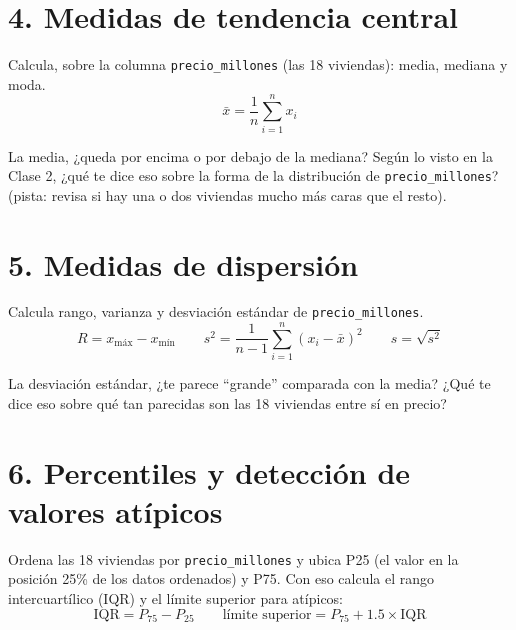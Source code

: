 \documentclass[11pt]{article}
\begin{document}
\section*{4. Medidas de tendencia central}

Calcula, sobre la columna \texttt{precio\_millones} (las 18 viviendas):
media, mediana y moda.
\[
  \bar{x} = \frac{1}{n}\sum_{i=1}^n x_i
\]

\begin{espacio}[5.5cm]
\end{espacio}

\begin{pregunta}
La media, ¿queda por encima o por debajo de la mediana? Según lo visto en
la Clase 2, ¿qué te dice eso sobre la forma de la distribución de
\texttt{precio\_millones}? (pista: revisa si hay una o dos viviendas
mucho más caras que el resto).
\end{pregunta}
\begin{espacio}[3cm]
\end{espacio}

\section*{5. Medidas de dispersión}

Calcula rango, varianza y desviación estándar de \texttt{precio\_millones}.
\[
  R = x_{\text{máx}} - x_{\text{mín}} \qquad
  s^2 = \frac{1}{n-1}\sum_{i=1}^n (x_i - \bar{x})^2 \qquad
  s = \sqrt{s^2}
\]

\begin{espacio}[6.5cm]
\end{espacio}

\begin{pregunta}
La desviación estándar, ¿te parece ``grande'' comparada con la media?
¿Qué te dice eso sobre qué tan parecidas son las 18 viviendas entre sí en
precio?
\end{pregunta}
\begin{espacio}[3cm]
\end{espacio}

\newpage
\section*{6. Percentiles y detección de valores atípicos}

Ordena las 18 viviendas por \texttt{precio\_millones} y ubica P25 (el
valor en la posición 25\% de los datos ordenados) y P75. Con eso calcula
el rango intercuartílico (IQR) y el límite superior para atípicos:
\[
  \text{IQR} = P_{75} - P_{25} \qquad
  \text{límite superior} = P_{75} + 1.5 \times \text{IQR}
\]
\end{document}
